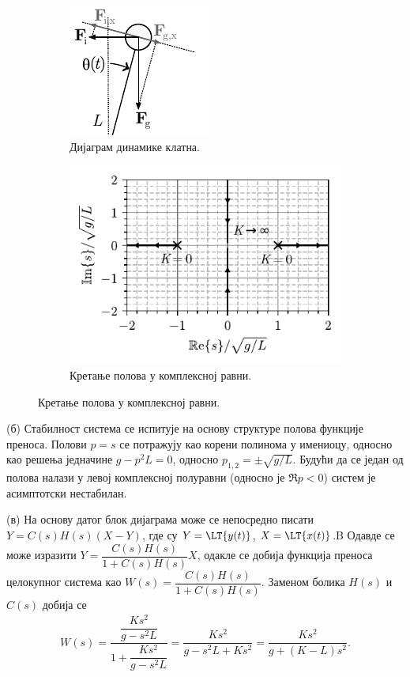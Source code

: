 \begin{figure}[ht!]
    \centering
    \begin{subfigure}{0.39\textwidth}
        \centering
        \includegraphics{fig/klatno_dinamika.pdf}
        \caption{Дијаграм динамике клатна.}
        \label{fig:\ID.2}
    \end{subfigure}
    \begin{subfigure}{0.59\textwidth}
        \centering
        \includegraphics{fig/pmap_klatno_edit.pdf}
        \caption{Кретање полова у комплексној равни.}
        \label{fig:\ID.3}
    \end{subfigure}
\end{figure}


(б) Стабилност система се испитује на основу структуре полова функције преноса. Полови $p=s$ се потражују као корени полинома у имениоцу, односно као 
решења једначине $g - p^2L = 0$, односно $p_{1,2} = \pm \sqrt{g/L}$. Будући да се један од полова налази у левој комплексној полуравни (односно је 
$\Re{p} < 0$) систем је асимптотски нестабилан. 

(в) 
На основу датог блок дијаграма може се непосредно писати 
$Y = C(s)H(s)( X - Y )$, где су $Y = \LT{y(t)}$, $X = \LT{x(t)}$.B Одавде се може изразити 
$Y = \dfrac{C(s)H(s)}{1 + C(s)H(s)} X$, одакле се добија функција преноса 
целокупног система као $W(s) = \dfrac{C(s)H(s)}{1 + C(s)H(s)}$. Заменом болика $H(s)$ и $C(s)$ добија се 
\begin{eqnarray}
    W(s) = \dfrac{ \dfrac{Ks^2}{g - s^2L} }{ 1  + \dfrac{Ks^2}{g - s^2L}} = 
    \dfrac{ Ks^2 }{ g - s^2L + Ks^2} = \dfrac{ Ks^2 }{ g + (K-L)s^2}. 
\end{eqnarray}


